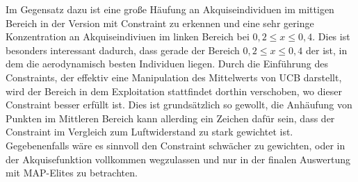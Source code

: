 Im Gegensatz dazu ist eine große Häufung an Akquiseindividuen im mittigen Bereich in der Version mit Constraint zu erkennen
und eine sehr geringe Konzentration an Akquiseindiviuen im linken Bereich bei $0,2 \leq x \leq 0,4$.
Dies ist besonders interessant dadurch, dass gerade der Bereich $0,2 \leq x \leq 0,4$ der ist, in dem die aerodynamisch besten Individuen liegen.
Durch die Einführung des Constraints, der effektiv eine Manipulation des Mittelwerts von UCB darstellt, wird der Bereich in dem Exploitation stattfindet dorthin verschoben, wo dieser Constraint besser erfüllt ist.
Dies ist grundsätzlich so gewollt, die Anhäufung von Punkten im Mittleren Bereich kann allerding ein Zeichen dafür sein, dass der Constraint im Vergleich zum Luftwiderstand zu stark gewichtet ist.
Gegebenenfalls wäre es sinnvoll den Constraint schwächer zu gewichten, oder in der Akquisefunktion vollkommen wegzulassen und nur in der finalen Auswertung mit MAP-Elites zu betrachten.

\newcommand{\wheelcasepheno}[1]{
	\begin{figure}[h]
		\centering
		\begin{minipage}{0.5\textwidth}
			\centering
			\texttt{[image: bilder/6pt1000Samples/\#1-uncon-top.png]}
			\caption{Phänotyp des Individuums (#1), oben (ohne Constraint)}
			\label{fig:wheelcasepheno#1-uncon-front}
		\end{minipage}\hfill
		\begin{minipage}{0.5\textwidth}
			\centering
			\texttt{[image: bilder/6pt1000Samples/\#1-uncon-angled.png]}
			\caption{Phänotyp des Individuums (#1), perspektivisch (ohne Constraint)}
			\label{fig:wheelcasepheno#1-uncon-angled}
		\end{minipage}
		\begin{minipage}{0.5\textwidth}
			\centering
			\texttt{[image: bilder/6pt1000Samples/\#1-con-top.png]}
			\caption{Phänotyp des Individuums (#1), oben (mit Constraint)}
			\label{fig:wheelcasepheno#1-con-front}
		\end{minipage}\hfill
		\begin{minipage}{0.5\textwidth}
			\centering
			\texttt{[image: bilder/6pt1000Samples/\#1-con-angled.png]}
			\caption{Phänotyp des Individuums (#1), perspektivisch (mit Constraint)}
			\label{fig:wheelcasepheno#1-con-angled}
		\end{minipage}
	\end{figure}
}

\newcommand{\wref}[2]{
	fig:wheelcasepheno#1-#2
}

